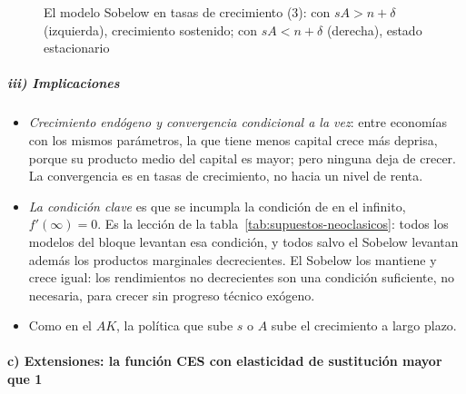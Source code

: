 \documentclass[11pt]{article}
\begin{document}
\begin{figure}[H]
\centering
\caption{El modelo Sobelow en tasas de crecimiento (3): con $sA>n+\delta$ (izquierda), crecimiento sostenido; con $sA<n+\delta$ (derecha), estado estacionario}\label{fig:sobelow}
\end{figure}

\subparagraph{iii) Implicaciones}

\begin{itemize}
\item \emph{Crecimiento endógeno y convergencia condicional a la vez}: entre economías con los mismos parámetros, la que tiene menos capital crece más deprisa, porque su producto medio del capital es mayor; pero ninguna deja de crecer. La convergencia es en tasas de crecimiento, no hacia un nivel de renta.
\item \emph{La condición clave} es que se incumpla la condición de  en el infinito, $f'(\infty)=0$. Es la lección de la tabla~\ref{tab:supuestos-neoclasicos}: todos los modelos del bloque levantan esa condición, y todos salvo el Sobelow levantan además los productos marginales decrecientes. El Sobelow los mantiene y crece igual: los rendimientos no decrecientes son una condición suficiente, no necesaria, para crecer sin progreso técnico exógeno\nocite{JonesManuelli1990}.
\item Como en el $AK$, la política que sube $s$ o $A$ sube el crecimiento a largo plazo.
\end{itemize}

\paragraph{c) Extensiones: la función CES con elasticidad de sustitución mayor que 1}
\end{document}

